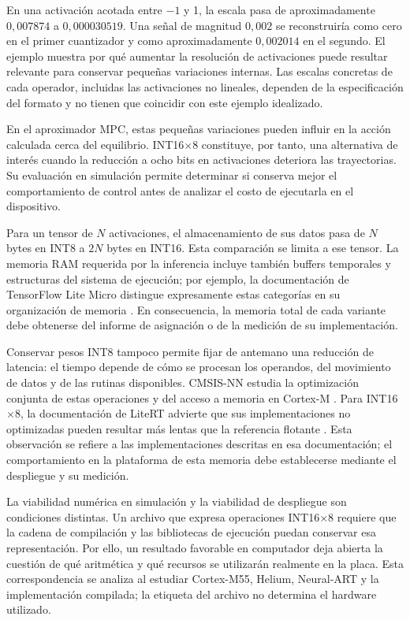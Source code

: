 En una activación acotada entre $-1$ y 1, la escala pasa de aproximadamente $0{,}007874$ a $0{,}000030519$. Una señal de magnitud $0{,}002$ se reconstruiría como cero en el primer cuantizador y como aproximadamente $0{,}002014$ en el segundo. El ejemplo muestra por qué aumentar la resolución de activaciones puede resultar relevante para conservar pequeñas variaciones internas. Las escalas concretas de cada operador, incluidas las activaciones no lineales, dependen de la especificación del formato y no tienen que coincidir con este ejemplo idealizado.

En el aproximador MPC, estas pequeñas variaciones pueden influir en la acción calculada cerca del equilibrio. INT16$\times$8 constituye, por tanto, una alternativa de interés cuando la reducción a ocho bits en activaciones deteriora las trayectorias. Su evaluación en simulación permite determinar si conserva mejor el comportamiento de control antes de analizar el costo de ejecutarla en el dispositivo.

Para un tensor de $N$ activaciones, el almacenamiento de sus datos pasa de $N$ bytes en INT8 a $2N$ bytes en INT16. Esta comparación se limita a ese tensor. La memoria RAM requerida por la inferencia incluye también buffers temporales y estructuras del sistema de ejecución; por ejemplo, la documentación de TensorFlow Lite Micro distingue expresamente estas categorías en su organización de memoria \cite{tflmmemory}. En consecuencia, la memoria total de cada variante debe obtenerse del informe de asignación o de la medición de su implementación.

Conservar pesos INT8 tampoco permite fijar de antemano una reducción de latencia: el tiempo depende de cómo se procesan los operandos, del movimiento de datos y de las rutinas disponibles. CMSIS-NN estudia la optimización conjunta de estas operaciones y del acceso a memoria en Cortex-M \cite{lai2018}. Para INT16$\times$8, la documentación de LiteRT advierte que sus implementaciones no optimizadas pueden resultar más lentas que la referencia flotante \cite{litert16}. Esta observación se refiere a las implementaciones descritas en esa documentación; el comportamiento en la plataforma de esta memoria debe establecerse mediante el despliegue y su medición.

La viabilidad numérica en simulación y la viabilidad de despliegue son condiciones distintas. Un archivo que expresa operaciones INT16$\times$8 requiere que la cadena de compilación y las bibliotecas de ejecución puedan conservar esa representación. Por ello, un resultado favorable en computador deja abierta la cuestión de qué aritmética y qué recursos se utilizarán realmente en la placa. Esta correspondencia se analiza al estudiar Cortex-M55, Helium, Neural-ART y la implementación compilada; la etiqueta del archivo no determina el hardware utilizado.

